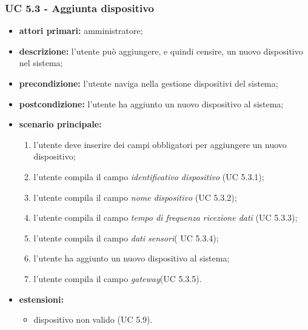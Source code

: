 			\subsubsection{UC 5.3 - Aggiunta dispositivo}
			\begin{itemize}
				\item \textbf{attori primari:} amministratore;
				\item \textbf{descrizione:} l'utente può aggiungere, e quindi censire, un nuovo dispositivo nel sistema;
				\item \textbf{precondizione:} l'utente naviga nella gestione dispositivi del sistema;
				\item \textbf{postcondizione:} l'utente ha aggiunto un nuovo dispositivo al sistema;
				\item \textbf{scenario principale:}
				\begin{enumerate}
					\item{l'utente deve inserire dei campi obbligatori per aggiungere un nuovo dispositivo;}
					\item{l'utente compila il campo \textit{identificativo dispositivo} (UC 5.3.1);}
					\item{l'utente compila il campo \textit{nome dispositivo} (UC 5.3.2);}
					\item{l'utente compila il campo \textit{tempo di frequenza ricezione dati} (UC 5.3.3);}
					\item{l'utente compila il campo \textit{dati sensori}( UC 5.3.4);}
					\item{l'utente ha aggiunto un nuovo dispositivo al sistema;}
					\item{l'utente compila il campo \textit{gateway}(UC 5.3.5).}
				\end{enumerate}
				\item \textbf{estensioni:}
				\begin{itemize}
					\item dispositivo non valido (UC 5.9).
				\end{itemize}
			\end{itemize}

